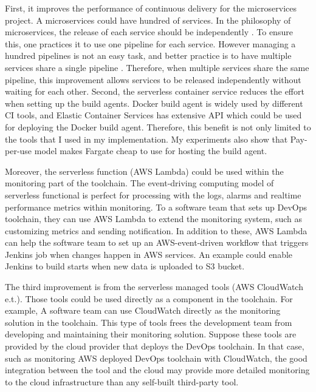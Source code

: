 First, it improves the performance of continuous delivery for the microservices project. A microservices could have hundred of services. In the philosophy of microservices, the release of each service should be independently \cite{dehghani2018break}. To ensure this, one practices it to use one pipeline for each service. However managing a hundred pipelines is not an easy task, and better practice is to have multiple services share a single pipeline \cite{HowtoSca9:online}. Therefore, when multiple services share the same pipeline, this improvement allows services to be released independently without waiting for each other.
Second, the serverless container service reduces the effort when setting up the build agents. Docker build agent is widely used by different CI tools, and Elastic Container Services has extensive API which could be used for deploying the Docker build agent. Therefore, this benefit is not only limited to the tools that I used in my implementation. My experiments also show that Pay-per-use model makes Fargate cheap to use for hosting the build agent.
\par
Moreover, the serverless function (AWS Lambda) could be used within the monitoring part of the toolchain. The event-driving computing model of serverless functional is perfect for processing with the logs, alarms and realtime performance metrics within monitoring. To a software team that sets up DevOps toolchain, they can use AWS Lambda to extend the monitoring system, such as customizing metrics and sending notification. In addition to these, AWS Lambda can help the software team to set up an AWS-event-driven workflow that triggers Jenkins job when changes happen in AWS services. An example could enable Jenkins to build starts when new data is uploaded to S3 bucket.
\par
The third improvement is from the serverless managed tools (AWS CloudWatch e.t.). Those tools could be used directly as a component in the toolchain. For example, A software team can use CloudWatch directly as the monitoring solution in the toolchain. This type of tools frees the development team from developing and maintaining their monitoring solution. Suppose these tools are provided by the cloud provider that deploys the DevOps toolchain. In that case, such as monitoring AWS deployed DevOps toolchain with CloudWatch, the good integration between the tool and the cloud may provide more detailed monitoring to the cloud infrastructure than any self-built third-party tool.
\par
